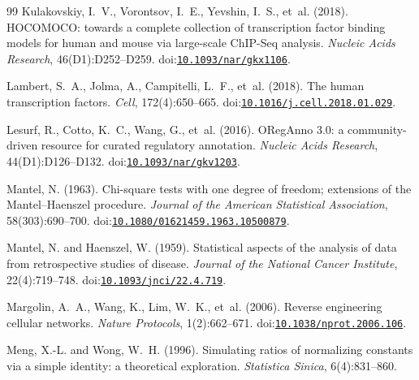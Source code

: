 \begin{thebibliography}{99}
Kulakovskiy, I.~V., Vorontsov, I.~E., Yevshin, I.~S., et~al. (2018).
\newblock HOCOMOCO: towards a complete collection of transcription factor binding models for human and mouse via large-scale ChIP-Seq analysis.
\newblock \emph{Nucleic Acids Research}, 46(D1):D252--D259.
\newblock doi:\href{https://doi.org/10.1093/nar/gkx1106}{\nolinkurl{10.1093/nar/gkx1106}}.

Lambert, S.~A., Jolma, A., Campitelli, L.~F., et~al. (2018).
\newblock The human transcription factors.
\newblock \emph{Cell}, 172(4):650--665.
\newblock doi:\href{https://doi.org/10.1016/j.cell.2018.01.029}{\nolinkurl{10.1016/j.cell.2018.01.029}}.

Lesurf, R., Cotto, K.~C., Wang, G., et~al. (2016).
\newblock ORegAnno 3.0: a community-driven resource for curated regulatory annotation.
\newblock \emph{Nucleic Acids Research}, 44(D1):D126--D132.
\newblock doi:\href{https://doi.org/10.1093/nar/gkv1203}{\nolinkurl{10.1093/nar/gkv1203}}.

Mantel, N. (1963).
\newblock Chi-square tests with one degree of freedom; extensions of the {Mantel--Haenszel} procedure.
\newblock \emph{Journal of the American Statistical Association}, 58(303):690--700.
\newblock doi:\href{https://doi.org/10.1080/01621459.1963.10500879}{\nolinkurl{10.1080/01621459.1963.10500879}}.

Mantel, N. and Haenszel, W. (1959).
\newblock Statistical aspects of the analysis of data from retrospective studies of disease.
\newblock \emph{Journal of the National Cancer Institute}, 22(4):719--748.
\newblock doi:\href{https://doi.org/10.1093/jnci/22.4.719}{\nolinkurl{10.1093/jnci/22.4.719}}.

Margolin, A.~A., Wang, K., Lim, W.~K., et~al. (2006).
\newblock Reverse engineering cellular networks.
\newblock \emph{Nature Protocols}, 1(2):662--671.
\newblock doi:\href{https://doi.org/10.1038/nprot.2006.106}{\nolinkurl{10.1038/nprot.2006.106}}.

Meng, X.-L. and Wong, W.~H. (1996).
\newblock Simulating ratios of normalizing constants via a simple identity: a theoretical exploration.
\newblock \emph{Statistica Sinica}, 6(4):831--860.


\end{thebibliography}
